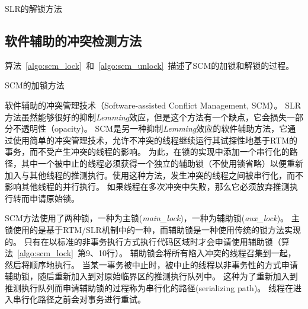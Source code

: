 \begin{algorithm}[htbp]
\SetAlgoLined
{}
\caption{SLR的解锁方法}
\label{algo:slr_unlock}
\end{algorithm}


\subsection{软件辅助的冲突检测方法}

算法~\ref{algo:scm_lock}~和~\ref{algo:scm_unlock}~描述了SCM的加锁和解锁的过程。

\begin{algorithm}[htbp]
\SetAlgoLined
{}
\caption{SCM的加锁方法}
\label{algo:scm_lock}
\end{algorithm}

软件辅助的冲突管理技术（Software-assisted Conflict Management, SCM）。
SLR方法虽然能够很好的抑制\textit{Lemming}效应，但是这个方法有一个缺点，它会损失一部分不透明性（opacity)。
SCM是另一种抑制\textit{Lemming}效应的软件辅助方法，它通过使用简单的冲突管理技术，允许不冲突的线程继续运行其试探性地基于RTM的事务，而不受产生冲突的线程的影响。
为此，在锁的实现中添加一个串行化的路径，其中一个被中止的线程必须获得一个独立的辅助锁（不使用锁省略）以便重新加入与其他线程的推测执行。使用这种方法，发生冲突的线程之间被串行化，而不影响其他线程的并行执行。
如果线程在多次冲突中失败，那么它必须放弃推测执行转而申请原始锁。

SCM方法使用了两种锁，一种为主锁(\textit{main\_lock})，一种为辅助锁(\textit{aux\_lock})。
主锁使用的是基于RTM/SLR机制中的一种，而辅助锁是一种使用传统的锁方法实现的。
只有在以标准的非事务执行方式执行代码区域时才会申请使用辅助锁（算法~\ref{algo:scm_lock}~第9、10行）。
辅助锁会将所有陷入冲突的线程召集到一起，然后将顺序地执行。
当某一事务被中止时，被中止的线程以非事务性的方式申请辅助锁，随后重新加入到对原始临界区的推测执行队列中。
这种为了重新加入到推测执行队列而申请辅助锁的过程称为串行化的路径(serializing path)。
线程在进入串行化路径之前会对事务进行重试。

